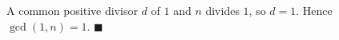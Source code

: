 A common positive divisor $d$ of $1$ and $n$ divides $1$, so $d=1$. Hence $\gcd(1,n)=1$. $\blacksquare$
